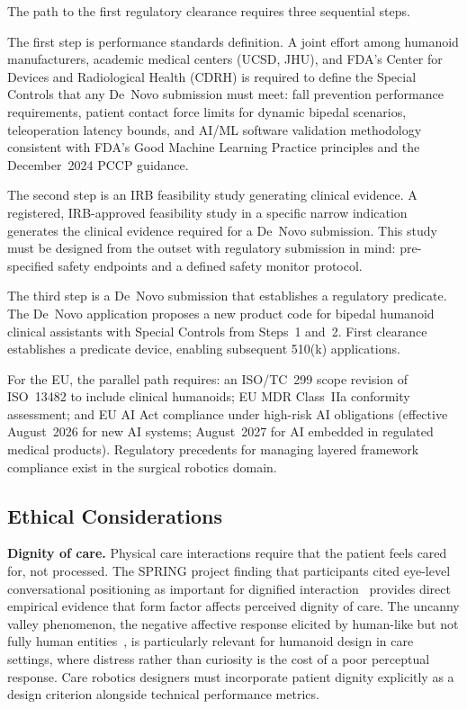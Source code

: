 \documentclass[acmjour]{acmart}
\begin{document}
The path to the first regulatory clearance requires three sequential steps.

The first step is performance standards definition. A joint effort among humanoid
manufacturers, academic medical centers (UCSD, JHU), and FDA's Center for Devices
and Radiological Health (CDRH) is required to define the Special Controls that
any De~Novo submission must meet: fall prevention performance requirements, patient
contact force limits for dynamic bipedal scenarios, teleoperation latency bounds,
and AI/ML software validation methodology consistent with FDA's Good Machine
Learning Practice principles and the December~2024 PCCP guidance.

The second step is an IRB feasibility study generating clinical evidence. A
registered,
IRB-approved feasibility study in a specific narrow indication generates the
clinical evidence required for a De~Novo submission. This study must be designed
from the outset with regulatory submission in mind: pre-specified safety endpoints
and a defined safety monitor protocol.

The third step is a De~Novo submission that establishes a regulatory predicate.
The De~Novo application proposes a new product code for bipedal humanoid clinical
assistants with Special Controls from Steps~1 and~2. First clearance establishes
a predicate device, enabling subsequent 510(k) applications.

For the EU, the parallel path requires: an ISO/TC~299 scope revision of
ISO~13482 to include clinical humanoids; EU MDR Class~IIa conformity assessment;
and EU AI Act compliance under high-risk AI obligations (effective August~2026 for
new AI systems; August~2027 for AI embedded in regulated medical products).
Regulatory precedents for managing layered framework compliance exist in the
surgical robotics domain.

\subsection{Ethical Considerations}
\label{sec:ethics}

\textbf{Dignity of care.} Physical care interactions require that the patient
feels cared for, not processed. The SPRING project finding that participants cited
eye-level conversational positioning as important for dignified
interaction~\cite{alamedapineda2024spring} provides direct empirical evidence that
form factor affects perceived dignity of care. The uncanny valley phenomenon, the
negative affective response elicited by human-like but not fully human
entities~\cite{mori2012uncanny}, is particularly relevant for humanoid design in
care settings, where distress rather than curiosity is the cost of a poor
perceptual response. Care robotics designers must incorporate patient dignity
explicitly as a design criterion alongside technical performance metrics.
\end{document}
